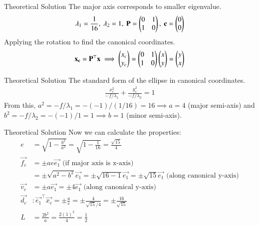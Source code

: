 \documentclass{beamer}
\begin{document}
\begin{frame}{Theoretical Solution}
The major axis corresponds to smaller eigenvalue.
\begin{align}
    \lambda_1 = \frac{1}{16}, \text{ } \lambda_2 = 1, \text{ } \mathbf{P} = \begin{pmatrix}0 & 1 \\ 1 & 0\end{pmatrix}, \text{ } \mathbf{c} = \begin{pmatrix}0 \\ 0\end{pmatrix}
\end{align}
Applying the rotation to find the canonical coordinates.
\begin{align}
    \mathbf{x_c} = \mathbf{P}^\top\mathbf{x} \implies \begin{pmatrix}x_c \\ y_c\end{pmatrix} = \begin{pmatrix}0 & 1 \\ 1 & 0\end{pmatrix}\begin{pmatrix}x \\ y\end{pmatrix} = \begin{pmatrix}y \\ x\end{pmatrix}
\end{align}
\end{frame}

\begin{frame}{Theoretical Solution}
The standard form of the ellipse in canonical coordinates.
\begin{align}
    \frac{x_c^2}{-f/\lambda_1} + \frac{y_c^2}{-f/\lambda_2} = 1
\end{align}
From this, $a^2 = -f/\lambda_1 = -(-1)/(1/16) = 16 \implies a=4$ (major semi-axis) and $b^2 = -f/\lambda_2 = -(-1)/1 = 1 \implies b=1$ (minor semi-axis).
\end{frame}

\begin{frame}{Theoretical Solution}
Now we can calculate the properties:
\begin{align}
    e &= \sqrt{1 - \frac{b^2}{a^2}} = \sqrt{1 - \frac{1}{16}} = \frac{\sqrt{15}}{4} \\
    \vec{f_c} &= \pm ae \vec{e_1} \text{ (if major axis is x-axis)} \\
    &= \pm \sqrt{a^2-b^2} \vec{e_1} = \pm \sqrt{16-1} \vec{e_1} = \pm\sqrt{15}\vec{e_1} \text{ (along canonical y-axis)} \\
    \vec{v_c} &= \pm a\vec{e_1} = \pm 4\vec{e_1} \text{ (along canonical y-axis)} \\
    \vec{d_c} &: \vec{e_1}^\top\vec{x_c} = \pm \frac{a}{e} = \pm \frac{4}{\sqrt{15}/4} = \pm\frac{16}{\sqrt{15}} \\
    L &= \frac{2b^2}{a} = \frac{2(1)^2}{4} = \frac{1}{2}
\end{align}
\end{frame}
\end{document}
